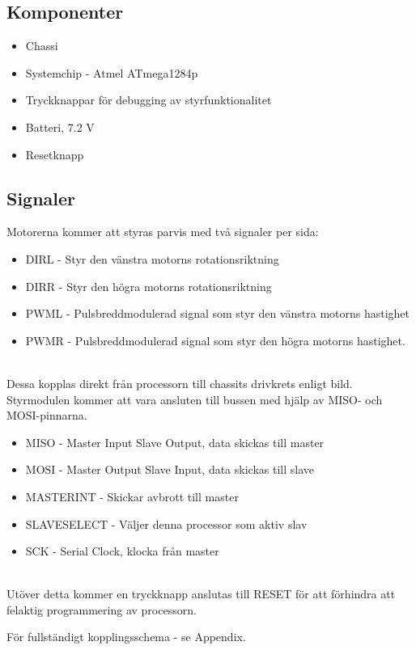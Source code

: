 \documentclass[a4paper,12pt,fleqn]{article}
\begin{document}

\subsection{Komponenter}
\begin{itemize}
	\item Chassi
	\item Systemchip - Atmel ATmega1284p
	\item Tryckknappar för debugging av styrfunktionalitet
	\item Batteri, 7.2 V
	\item Resetknapp
\end{itemize}
\subsection{Signaler}
Motorerna kommer att styras parvis med två signaler per sida:
\begin{itemize}
	\item DIRL - Styr den vänstra motorns rotationsriktning
	\item DIRR - Styr den högra motorns rotationsriktning
	\item PWML - Pulsbreddmodulerad signal som styr den vänstra motorns hastighet
	\item PWMR - Pulsbreddmodulerad signal som styr den högra motorns hastighet.
\end{itemize}
~\\
Dessa kopplas direkt från processorn till chassits drivkrets enligt bild.
Styrmodulen kommer att vara ansluten till bussen med hjälp av MISO- och MOSI-pinnarna.

\begin{itemize}
	\item MISO - Master Input Slave Output, data skickas till master
	\item MOSI - Master Output Slave Input, data skickas till slave
	\item MASTERINT - Skickar avbrott till master
	\item SLAVESELECT - Väljer denna processor som aktiv slav
	\item SCK - Serial Clock, klocka från master
\end{itemize}
~\\
Utöver detta kommer en tryckknapp anslutas till RESET för att förhindra att felaktig programmering av processorn. 

För fullständigt kopplingsschema - se Appendix. 
\end{document}
